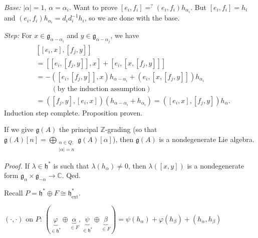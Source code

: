 \documentclass[etingof-lie.tex]{subfiles}
\begin{document}
\textit{Base:} $\left\vert \alpha\right\vert =1$, $\alpha=\alpha_{i}$. Want to
prove $\left[  e_{i},f_{i}\right]  =^{?}\left(  e_{i},f_{i}\right)
h_{\alpha_{i}}$. But $\left[  e_{i},f_{i}\right]  =h_{i}$ and $\left(
e_{i},f_{i}\right)  h_{\alpha_{i}}=d_{i}d_{i}^{-1}h_{i}$, so we are done with
the base.

\textit{Step:} For $x\in\mathfrak{g}_{\alpha-\alpha_{i}}$ and $y\in
\mathfrak{g}_{\alpha-\alpha_{j}}$, we have
\begin{align*}
&  \left[  \left[  e_{i},x\right]  ,\left[  f_{j},y\right]  \right] \\
&  =\left[  \left[  e_{i},\left[  f_{j},y\right]  \right]  ,x\right]  +\left[
e_{i},\left[  x,\left[  f_{j},y\right]  \right]  \right] \\
&  =-\left(  \left[  e_{i},\left[  f_{j},y\right]  \right]  ,x\right)
h_{\alpha-\alpha_{i}}+\left(  e_{i},\left[  x,\left[  f_{j},y\right]  \right]
\right)  h_{\alpha_{i}}\\
&  \ \ \ \ \ \ \ \ \ \ \left(  \text{by the induction assumption}\right) \\
&  =\left(  \left[  f_{j},y\right]  ,\left[  e_{i},x\right]  \right)  \left(
h_{\alpha-\alpha_{i}}+h_{\alpha_{i}}\right)  =\left(  \left[  e_{i},x\right]
,\left[  f_{j},y\right]  \right)  h_{\alpha}.
\end{align*}
Induction step complete. Proposition proven.

\begin{corollary}
If we give $\mathfrak{g}\left(  A\right)  $ the principal $\mathbb{Z}$-grading
(so that $\mathfrak{g}\left(  A\right)  \left[  n\right]  =\bigoplus
\limits_{\substack{\alpha\in Q;\\\left\vert \alpha\right\vert =n}%
}\mathfrak{g}\left(  A\right)  \left[  \alpha\right]  $), then $\mathfrak{g}%
\left(  A\right)  $ is a nondegenerate Lie algebra.
\end{corollary}

\textit{Proof.} If $\lambda\in\mathfrak{h}^{\ast}$ is such that $\lambda
\left(  h_{\alpha}\right)  \neq0$, then $\lambda\left(  \left[  x,y\right]
\right)  $ is a nondegenerate form $\mathfrak{g}_{\alpha}\times\mathfrak{g}%
_{-\alpha}\rightarrow\mathbb{C}$. Qed.

Recall $P=\mathfrak{h}^{\ast}\oplus F\cong\mathfrak{h}_{\operatorname*{ext}%
}^{\ast}$.

$\left(  \cdot,\cdot\right)  $ on $P$: $\left(  \underbrace{\varphi}%
_{\in\mathfrak{h}^{\ast}}\oplus\underbrace{\alpha}_{\in F},\underbrace{\psi
}_{\in\mathfrak{h}^{\ast}}\oplus\underbrace{\beta}_{\in F}\right)
=\psi\left(  h_{\alpha}\right)  +\varphi\left(  h_{\beta}\right)  +\left(
h_{\alpha},h_{\beta}\right)  $
\end{document}
